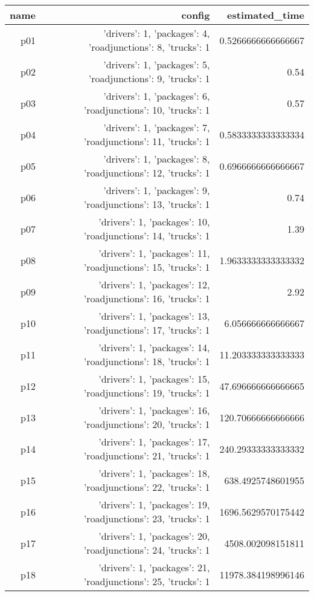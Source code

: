 \documentclass{article}
\begin{document}
                            \begin{center}
                            \scriptsize
                            \begin{tabular}{r|r|r}
                            name & config & estimated\_time\\\midrule
                              p01&{'drivers': 1, 'packages': 4, 'roadjunctions': 8, 'trucks': 1}&0.5266666666666667\\
  p02&{'drivers': 1, 'packages': 5, 'roadjunctions': 9, 'trucks': 1}&0.54\\
  p03&{'drivers': 1, 'packages': 6, 'roadjunctions': 10, 'trucks': 1}&0.57\\
  p04&{'drivers': 1, 'packages': 7, 'roadjunctions': 11, 'trucks': 1}&0.5833333333333334\\
  p05&{'drivers': 1, 'packages': 8, 'roadjunctions': 12, 'trucks': 1}&0.6966666666666667\\
  p06&{'drivers': 1, 'packages': 9, 'roadjunctions': 13, 'trucks': 1}&0.74\\
  p07&{'drivers': 1, 'packages': 10, 'roadjunctions': 14, 'trucks': 1}&1.39\\
  p08&{'drivers': 1, 'packages': 11, 'roadjunctions': 15, 'trucks': 1}&1.9633333333333332\\
  p09&{'drivers': 1, 'packages': 12, 'roadjunctions': 16, 'trucks': 1}&2.92\\
  p10&{'drivers': 1, 'packages': 13, 'roadjunctions': 17, 'trucks': 1}&6.056666666666667\\
  p11&{'drivers': 1, 'packages': 14, 'roadjunctions': 18, 'trucks': 1}&11.203333333333333\\
  p12&{'drivers': 1, 'packages': 15, 'roadjunctions': 19, 'trucks': 1}&47.696666666666665\\
  p13&{'drivers': 1, 'packages': 16, 'roadjunctions': 20, 'trucks': 1}&120.70666666666666\\
  p14&{'drivers': 1, 'packages': 17, 'roadjunctions': 21, 'trucks': 1}&240.29333333333332\\
  p15&{'drivers': 1, 'packages': 18, 'roadjunctions': 22, 'trucks': 1}&638.4925748601955\\
  p16&{'drivers': 1, 'packages': 19, 'roadjunctions': 23, 'trucks': 1}&1696.5629570175442\\
  p17&{'drivers': 1, 'packages': 20, 'roadjunctions': 24, 'trucks': 1}&4508.002098151811\\
  p18&{'drivers': 1, 'packages': 21, 'roadjunctions': 25, 'trucks': 1}&11978.384198996146\\

\end{tabular}
\end{center}
\end{document}
